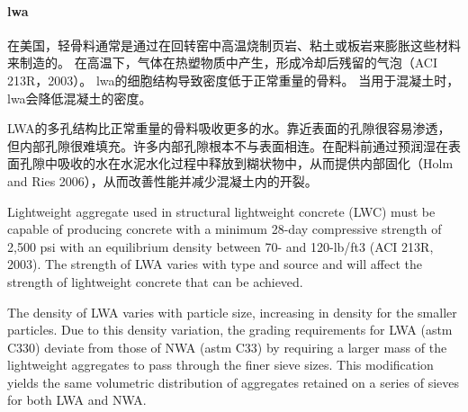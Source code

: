 \paragraph{\acrfull*{lwa}}
在美国，轻骨料通常是通过在回转窑中高温烧制页岩、粘土或板岩来膨胀这些材料来制造的。 在高温下，气体在热塑物质中产生，形成冷却后残留的气泡（ACI 213R，2003）。 \acrlong*{lwa}的细胞结构导致密度低于正常重量的骨料。 当用于混凝土时，\acrlong*{lwa}会降低混凝土的密度。

LWA的多孔结构比正常重量的骨料吸收更多的水。靠近表面的孔隙很容易渗透，但内部孔隙很难填充。许多内部孔隙根本不与表面相连。在配料前通过预润湿在表面孔隙中吸收的水在水泥水化过程中释放到糊状物中，从而提供内部固化（Holm and Ries 2006），从而改善性能并减少混凝土内的开裂。

Lightweight aggregate used in structural lightweight concrete (LWC) must be capable of producing concrete with a minimum 28-day compressive strength of 2,500 psi with an equilibrium density between 70- and 120-lb/ft3 (ACI 213R, 2003). The strength of LWA varies with type and source and will affect the strength of lightweight concrete that can be achieved.

The density of LWA varies with particle size, increasing in density for the smaller particles. Due to this density variation, the grading requirements for LWA (\acrshort*{astm} C330) deviate from those of NWA (\acrshort*{astm} C33) by requiring a larger mass of the lightweight aggregates to pass through the finer sieve sizes. This modification yields the same volumetric distribution of aggregates retained on a series of sieves for both LWA and NWA.

